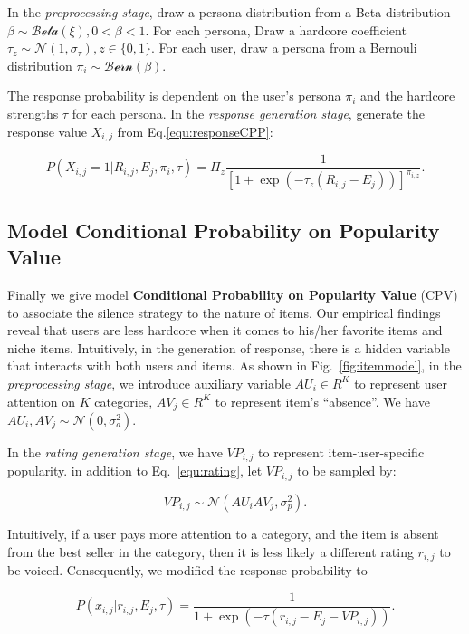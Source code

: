 \documentclass[sigconf]{acmart}
\begin{document}
In the \textit{preprocessing stage}, draw a persona distribution from a Beta distribution $\beta \sim \mathcal{Beta}(\xi), 0<\beta<1$. For each persona, Draw a hardcore coefficient $\tau_z \sim \mathcal{N}(1,\sigma_\tau), z\in \{0,1\}$. For each user, draw a persona from a Bernouli distribution $\pi_i \sim \mathcal{Bern} (\beta)$. 

The response probability is dependent on the user's persona $\pi_i$ and the hardcore strengths $\tau$ for each persona. In the \textit{response generation stage}, generate the response value $X_{i,j}$ from Eq.\ref{equ:responseCPP}:

\begin{equation}\label{equ:responseCPP}
 P(X_{i,j}=1|R_{i,j},E_j,\pi_i,\tau)=\Pi_z \frac{1}{{[1+\exp{(-\tau_z(R_{i,j}-E_j))}]}^{\pi_{i,z}}}.
\end{equation}

\subsection{Model Conditional Probability on Popularity Value}
Finally we give model \textbf{Conditional Probability on Popularity Value} (CPV) to associate the silence strategy to the nature of items. Our empirical findings reveal that users are less hardcore when it comes to his/her favorite items and niche items. Intuitively, in the generation of response, there is a hidden variable that interacts with both users and items. As shown in Fig.~\ref{fig:itemmodel}, in the \textit{preprocessing stage}, we introduce auxiliary variable $AU_i\in R^K$ to represent user attention on $K$ categories, $AV_j\in R^K$ to represent item's ``absence''. We have  $AU_i, AV_j \sim \mathcal{N}(0,\sigma_a^2)$.


In the \textit{rating generation stage}, we have $VP_{i,j}$ to represent item-user-specific popularity. in addition to Eq.~\ref{equ:rating}, let $VP_{i,j}$ to be sampled by:

\begin{equation}\label{equ:popularity}
VP_{i,j}\sim \mathcal{N}(AU_i AV_j,\sigma_p^2). 
\end{equation} 

Intuitively, if a user pays more attention to a category, and the item is absent from the best seller in the category, then it is less likely a different rating $r_{i,j}$ to be voiced.  Consequently, we modified the response probability to

\begin{equation}\label{equ:responseCPV}
P(x_{i,j}|r_{i,j},E_{j},\tau)=\frac{1}{1+\exp{(-\tau(r_{i,j}-E_{j}-VP_{i,j}))}}.
\end{equation}
\end{document}
